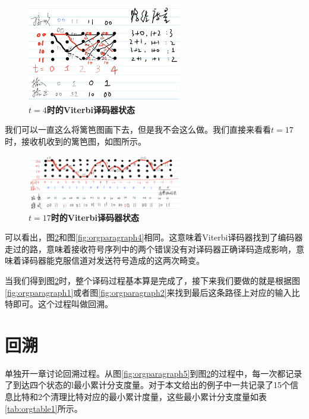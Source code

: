 \documentclass[10pt,a4paper,UTF8]{article}
\begin{document}
\begin{figure}[htb]
\centering
\includegraphics[width=0.6\textwidth]{../../img/20160101ViterbiT4.jpg}
\caption{\label{fig:orgparagraph8}
\textbf{\(t=4\)时的Viterbi译码器状态}}
\end{figure}

我们可以一直这么将篱笆图画下去，但是我不会这么做。我们直接来看看\(t=17\)时，接收机收到的篱笆图，如图所示。

\begin{figure}[htb]
\centering
\includegraphics[width=0.6\textwidth]{../../img/20160101ViterbiT17.jpg}
\caption{\label{fig:orgparagraph9}
\textbf{\(t=17\)时的Viterbi译码器状态}}
\end{figure}

可以看出，图\ref{fig:orgparagraph9}和图\ref{fig:orgparagraph4}相同。这意味着Viterbi译码器找到了编码器走过的路，意味着接收符号序列中的两个错误没有对译码器正确译码造成影响，意味着译码器能克服信道对发送符号造成的这两次畸变。

当我们得到图\ref{fig:orgparagraph9}时，整个译码过程基本算是完成了，接下来我们要做的就是根据图\ref{fig:orgparagraph1}或者图\ref{fig:orgparagraph2}来找到最后这条路径上对应的输入比特即可。这个过程叫做回溯。
\section{回溯}
\label{sec:orgheadline4}


单独开一章讨论回溯过程。从图\ref{fig:orgparagraph5}到图\ref{fig:orgparagraph9}的过程中，每一次都记录了到达四个状态的l最小累计分支度量。对于本文给出的例子中一共记录了15个信息比特和2个清理比特对应的最小累计度量，这些最小累计分支度量如表\ref{tab:orgtable1}所示。
\end{document}
